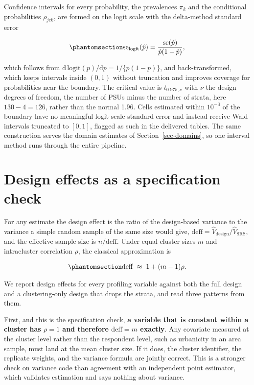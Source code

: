 \documentclass[
  12pt]{article}
\begin{document}
Confidence intervals for every probability, the prevalences \(\pi_k\)
and the conditional probabilities \(\rho_{jck}\), are formed on the
logit scale with the delta-method standard error

\begin{equation}\phantomsection\label{eq-logitse}{
\mathrm{se}_{\mathrm{logit}}(\hat p) = \frac{\mathrm{se}(\hat p)}{\hat p (1 - \hat p)},
}\end{equation}

which follows from
\(\mathrm{d}\,\mathrm{logit}(p)/\mathrm{d}p = 1/\{p(1-p)\}\), and
back-transformed, which keeps intervals inside \((0,1)\) without
truncation and improves coverage for probabilities near the boundary.
The critical value is \(t_{0.975, \nu}\) with \(\nu\) the design degrees
of freedom, the number of PSUs minus the number of strata, here
\(130 - 4 = 126\), rather than the normal 1.96. Cells estimated within
\(10^{-3}\) of the boundary have no meaningful logit-scale standard
error and instead receive Wald intervals truncated to \([0, 1]\),
flagged as such in the delivered tables. The same construction serves
the domain estimates of Section~\ref{sec-domains}, so one interval
method runs through the entire pipeline.

\section{Design effects as a specification check}\label{sec-deff}

For any estimate the design effect is the ratio of the design-based
variance to the variance a simple random sample of the same size would
give,
\(\mathrm{deff} = \widehat V_{\mathrm{design}} / \widehat V_{\mathrm{SRS}}\),
and the effective sample size is \(n/\mathrm{deff}\). Under equal
cluster sizes \(m\) and intracluster correlation \(\rho\), the classical
approximation is

\begin{equation}\phantomsection\label{eq-deff}{
\mathrm{deff} \;\approx\; 1 + (m - 1)\rho .
}\end{equation}

We report design effects for every profiling variable against both the
full design and a clustering-only design that drops the strata, and read
three patterns from them.

First, and this is the specification check, \textbf{a variable that is
constant within a cluster has \(\rho = 1\) and therefore
\(\mathrm{deff} = m\) exactly}. Any covariate measured at the cluster
level rather than the respondent level, such as urbanicity in an area
sample, must land at the mean cluster size. If it does, the cluster
identifier, the replicate weights, and the variance formula are jointly
correct. This is a stronger check on variance code than agreement with
an independent point estimator, which validates estimation and says
nothing about variance.
\end{document}
